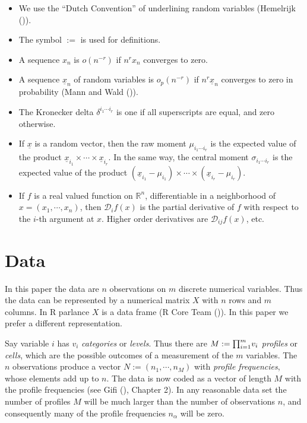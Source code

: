 \documentclass[
  12pt,
  letterpaper,
  DIV=11,
  numbers=noendperiod]{scrartcl}
\providecommand{\tightlist}{%
  \setlength{\itemsep}{0pt}\setlength{\parskip}{0pt}}\usepackage{longtable,booktabs,array}
\newcommand{\sectionbreak}{\clearpage}
\newcommand{\ul}[1]{\underline{#1}}
\begin{document}
\begin{itemize}
\tightlist
\item
  We use the ``Dutch Convention'' of underlining random variables
  (Hemelrijk ()).
\item
  The symbol \(:=\) is used for definitions.
\item
  A sequence \(x_n\) is \(o(n^{-r})\) if \(n^rx_n\) converges to zero.
\item
  A sequence \(\ul{x}_n\) of random variables is \(o_p(n^{-r})\) if
  \(n^r\ul{x}_n\) converges to zero in probability (Mann and Wald
  ()).
\item
  The Kronecker delta \(\delta^{i_1\cdots i_r}\) is one if all
  superscripts are equal, and zero otherwise.
\item
  If \(\ul{x}\) is a random vector, then the raw moment
  \(\mu_{i_1\cdots i_r}\) is the expected value of the product
  \(\ul{x}_{i_1}\times\cdots\times\ul{x}_{i_r}\). In the same way, the
  central moment \(\sigma_{i_1\cdots i_r}\) is the expected value of the
  product
  \((\ul{x}_{i_1}-\mu_{i_1})\times\cdots\times(\ul{x}_{i_r}-\mu_{i_r})\).
\item
  If \(f\) is a real valued function on \(\mathbb{R}^n\), differentiable
  in a neighborhood of \(x=(x_1,\cdots,x_n)\), then
  \(\mathcal{D}_if(x)\) is the partial derivative of \(f\) with respect
  to the \(i\)-th argument at \(x\). Higher order derivatives are
  \(\mathcal{D}_{ij}f(x)\), etc.
\end{itemize}

\sectionbreak

\section{Data}\label{data}

In this paper the data are \(n\) observations on \(m\) discrete
numerical variables. Thus the data can be represented by a numerical
matrix \(X\) with \(n\) rows and \(m\) columns. In R parlance \(X\) is a
data frame (R Core Team ()). In this
paper we prefer a different representation.

Say variable \(i\) has \(v_i\) \emph{categories} or \emph{levels}. Thus
there are \(M:=\smash{\prod_{i=1}^m}v_i\) \emph{profiles} or
\emph{cells}, which are the possible outcomes of a measurement of the
\(m\) variables. The \(n\) observations produce a vector
\(N:=(n_1,\cdots,n_M)\) with \emph{profile frequencies}, whose elements
add up to \(n\). The data is now coded as a vector of length \(M\) with
the profile frequencies (see Gifi (),
Chapter 2). In any reasonable data set the number of profiles \(M\) will
be much larger than the number of observations \(n\), and consequently
many of the profile frequencies \(n_\alpha\) will be zero.
\end{document}
